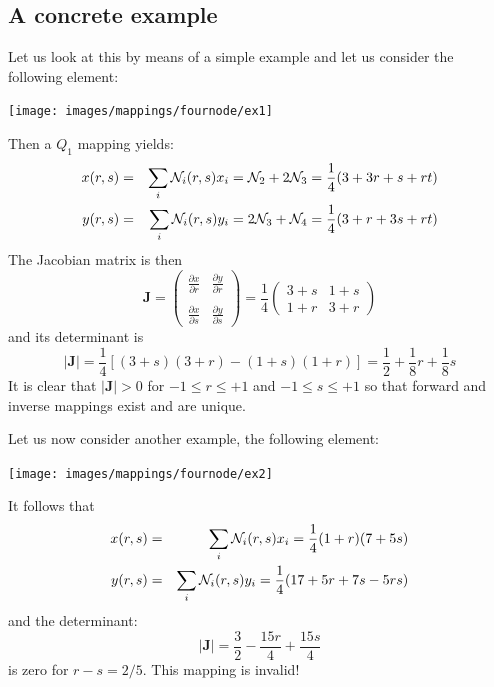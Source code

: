 \subsection{A concrete example}

Let us look at this by means of a simple example and let us consider the following 
element:
\begin{center}
\texttt{[image: images/mappings/fournode/ex1]}
\end{center}
Then a $Q_1$ mapping yields:
\begin{eqnarray}
x(r,s) &=& \sum_i {\mathcal{N}}_i(r,s) x_i = {\mathcal{N}}_2 + 2{\mathcal{N}}_3 = \frac{1}{4} (3+3r+ s+rt) \nonumber\\
y(r,s) &=& \sum_i {\mathcal{N}}_i(r,s) y_i = 2{\mathcal{N}}_3 + {\mathcal{N}}_4 = \frac{1}{4} (3+r+ 3s+rt) 
\end{eqnarray}
The Jacobian matrix is then
\begin{equation}
{\bm J} = 
\left(
\begin{array}{cc}
\frac{\partial x}{\partial r} & \frac{\partial y}{\partial r} \nonumber\\ \\
\frac{\partial x}{\partial s} & \frac{\partial y}{\partial s} \nonumber
\end{array}
\right)
=
\frac{1}{4}
\left(
\begin{array}{cc}
3+s & 1+s \\
1+r & 3+r
\end{array}
\right)
\end{equation}
and its determinant is 
\begin{equation}
|{\bm J}|=\frac{1}{4} [(3+s)(3+r)-(1+s)(1+r)]=\frac{1}{2}+\frac{1}{8}r+\frac{1}{8}s
\end{equation}
It is clear that $|{\bm J}|>0$ for $-1\leq r \leq +1$ and $-1\leq s \leq +1$ so that 
forward and inverse mappings exist and are unique. 

Let us now consider another example, the following element:
\begin{center}
\texttt{[image: images/mappings/fournode/ex2]}
\end{center}
It follows that
\begin{eqnarray}
x(r,s) &=& \sum_i {\mathcal{N}}_i(r,s) x_i = \frac{1}{4}(1+r)(7+5s) \\ 
y(r,s) &=& \sum_i {\mathcal{N}}_i(r,s) y_i = \frac{1}{4}(17+5r+7s-5rs)
\end{eqnarray}
and the determinant:
\[
|{\bm J}|=\frac{3}{2}-\frac{15r}{4}+\frac{15s}{4}
\]
is zero for $r-s=2/5$. This mapping is invalid!



